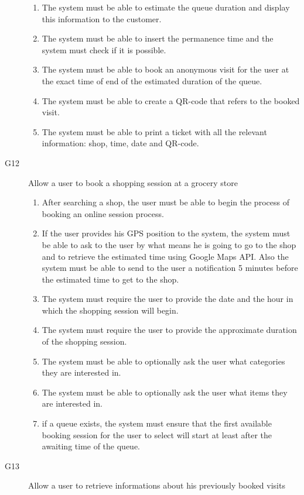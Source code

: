 \begin{description}
\begin{enumerate}[resume*]
            \item The system must be able to estimate the queue duration and display this information to the customer.
            \item The system must be able to insert the permanence time and the system must check if it is possible.
            \item The system must be able to book an anonymous visit for the user at the exact time of end of the estimated duration of the queue.
            \item The system must be able to create a QR-code that refers to the booked visit.
            \item The system must be able to print a ticket with all the relevant information: shop, time, date and QR-code.
        \end{enumerate}
    \item [G12] Allow a user to book a shopping session at a grocery store
        \begin{enumerate}[resume*]
            \item After searching a shop, the user must be able to begin the process of booking an online session process.
            \item If the user provides his GPS position to the system, the system must be able to ask to the user by what means he is going to go to the shop and to retrieve the estimated time using Google Maps API. Also the system must be able to send to the user a notification 5 minutes before the estimated time to get to the shop.
            \item The system must require the user to provide the date and the hour in which the shopping session will begin.
            \item The system must require the user to provide the approximate duration of the shopping session.
            \item The system must be able to optionally ask the user what categories they are interested in.
            \item The system must be able to optionally ask the user what items they are interested in.
            \item if a queue exists, the system must ensure that the first available booking session for the user to select will start at least after the awaiting time of the queue.
        \end{enumerate}
    \item [G13] Allow a user to retrieve informations about his previously booked visits

\end{description}
